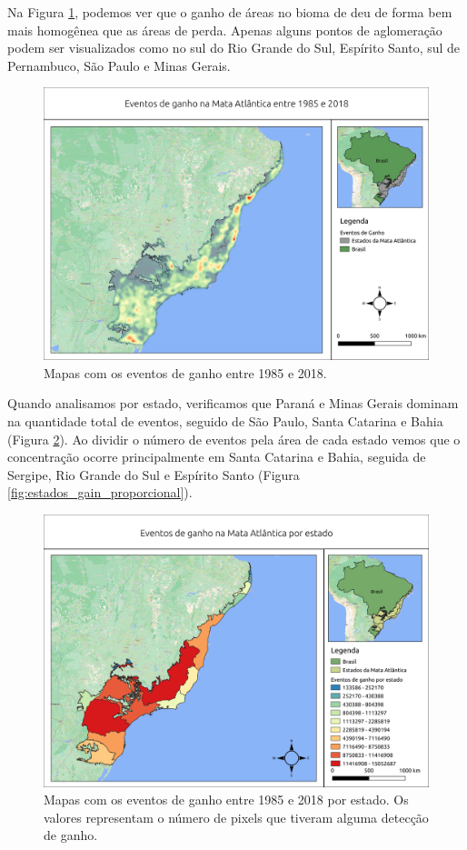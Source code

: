 Na Figura \ref{fig:heat_gain}, podemos ver que o ganho de áreas no bioma de deu de forma bem mais homogênea que as áreas de perda. Apenas alguns pontos de aglomeração podem ser visualizados como no sul do Rio Grande do Sul, Espírito Santo, sul de Pernambuco, São Paulo e Minas Gerais.

\begin{figure}[H]
    \centering
    \includegraphics[scale=.5]{images/heatmap_gain_masked18_dur_gt4_inv_for.png}
    \caption{Mapas com os eventos de ganho entre 1985 e 2018.}
    \label{fig:heat_gain}
\end{figure}

Quando analisamos por estado, verificamos que Paraná e Minas Gerais dominam na quantidade total de eventos, seguido de São Paulo, Santa Catarina e Bahia (Figura \ref{fig:estados_gain}). Ao dividir o número de eventos pela área de cada estado vemos que o concentração ocorre principalmente em Santa Catarina e Bahia, seguida de Sergipe, Rio Grande do Sul e Espírito Santo (Figura \ref{fig:estados_gain_proporcional}).

\begin{figure}[H]
    \centering
    \includegraphics[scale=.5]{images/estados_gain_seg6_masked18_dur_gt4_inv_for.png}
    \caption{Mapas com os eventos de ganho entre 1985 e 2018 por estado. Os valores representam o número de pixels que tiveram alguma detecção de ganho.}
    \label{fig:estados_gain}
\end{figure}

